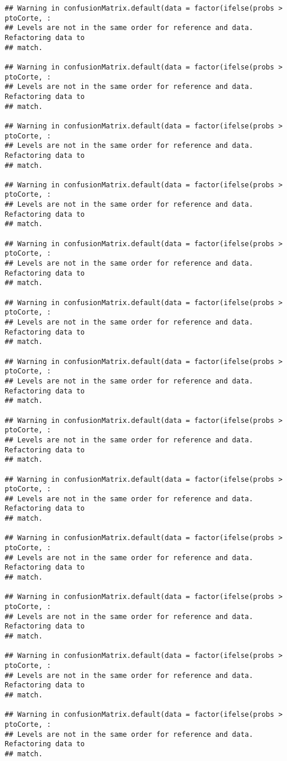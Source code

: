 \documentclass[
]{article}
\begin{document}
\begin{verbatim}
## Warning in confusionMatrix.default(data = factor(ifelse(probs > ptoCorte, :
## Levels are not in the same order for reference and data. Refactoring data to
## match.

## Warning in confusionMatrix.default(data = factor(ifelse(probs > ptoCorte, :
## Levels are not in the same order for reference and data. Refactoring data to
## match.

## Warning in confusionMatrix.default(data = factor(ifelse(probs > ptoCorte, :
## Levels are not in the same order for reference and data. Refactoring data to
## match.

## Warning in confusionMatrix.default(data = factor(ifelse(probs > ptoCorte, :
## Levels are not in the same order for reference and data. Refactoring data to
## match.

## Warning in confusionMatrix.default(data = factor(ifelse(probs > ptoCorte, :
## Levels are not in the same order for reference and data. Refactoring data to
## match.

## Warning in confusionMatrix.default(data = factor(ifelse(probs > ptoCorte, :
## Levels are not in the same order for reference and data. Refactoring data to
## match.

## Warning in confusionMatrix.default(data = factor(ifelse(probs > ptoCorte, :
## Levels are not in the same order for reference and data. Refactoring data to
## match.

## Warning in confusionMatrix.default(data = factor(ifelse(probs > ptoCorte, :
## Levels are not in the same order for reference and data. Refactoring data to
## match.

## Warning in confusionMatrix.default(data = factor(ifelse(probs > ptoCorte, :
## Levels are not in the same order for reference and data. Refactoring data to
## match.

## Warning in confusionMatrix.default(data = factor(ifelse(probs > ptoCorte, :
## Levels are not in the same order for reference and data. Refactoring data to
## match.

## Warning in confusionMatrix.default(data = factor(ifelse(probs > ptoCorte, :
## Levels are not in the same order for reference and data. Refactoring data to
## match.

## Warning in confusionMatrix.default(data = factor(ifelse(probs > ptoCorte, :
## Levels are not in the same order for reference and data. Refactoring data to
## match.

## Warning in confusionMatrix.default(data = factor(ifelse(probs > ptoCorte, :
## Levels are not in the same order for reference and data. Refactoring data to
## match.


\end{verbatim}
\end{document}

